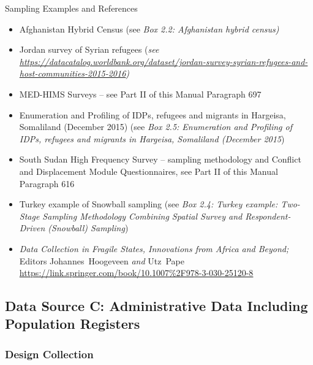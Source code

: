 \documentclass[
]{article}
\begin{document}
Sampling Examples and References

\begin{itemize}
\item
  Afghanistan Hybrid Census (see \emph{Box 2.2: Afghanistan hybrid census)}
\item
  Jordan survey of Syrian refugees (\emph{see
  \url{https://datacatalog.worldbank.org/dataset/jordan-survey-syrian-refugees-and-host-communities-2015-2016})}
\item
  MED-HIMS Surveys -- see Part II of this Manual Paragraph 697
\item
  Enumeration and Profiling of IDPs, refugees and migrants in
  Hargeisa, Somaliland (December 2015) (see \emph{Box 2.5: Enumeration and
  Profiling of IDPs, refugees and migrants in Hargeisa, Somaliland
  (December 2015})
\item
  South Sudan High Frequency Survey -- sampling methodology and
  Conflict and Displacement Module Questionnaires, see Part II of this
  Manual Paragraph 616
\item
  Turkey example of Snowball sampling (see \emph{Box 2.4: Turkey example:
  Two-Stage Sampling Methodology Combining Spatial Survey and
  Respondent-Driven (Snowball) Sampling})
\item
  \emph{Data Collection in Fragile States, Innovations from Africa and
  Beyond;} Editors Johannes~Hoogeveen \emph{and} Utz~Pape
  \url{https://link.springer.com/book/10.1007\%2F978-3-030-25120-8}
\end{itemize}

\hypertarget{data-source-c-administrative-data-including-population-registers}{%
\subsection{Data Source C: Administrative Data Including Population Registers}\label{data-source-c-administrative-data-including-population-registers}}

\hypertarget{design-collection-2}{%
\subsubsection{Design Collection}\label{design-collection-2}}
\end{document}
